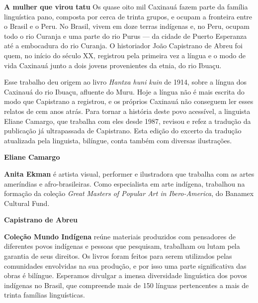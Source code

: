 \textbf{A mulher que virou tatu} Os quase oito mil Caxinauá fazem parte da família linguística pano, composta por cerca de trinta grupos, e ocupam a fronteira entre o Brasil e o Peru. No Brasil, vivem em doze terras indígenas e, no Peru, ocupam todo o rio Curanja e uma parte do rio Purus --- da cidade de Puerto Esperanza até a embocadura do rio Curanja. O historiador João Capistrano de Abreu foi quem, no início do século XX, registrou pela primeira vez a língua e o modo de vida Caxinauá junto a dois jovens provenientes da etnia, do rio Ibuaçu.

Esse trabalho deu origem ao livro \textit{Hantxa huni kuin} de 1914, sobre a língua dos Caxinauá do rio Ibuaçu, afluente do Muru. Hoje a língua não é mais escrita do modo que Capistrano a registrou, e os próprios Caxinauá não conseguem ler esses relatos de cem anos atrás. Para tornar a história deste povo acessível, a linguista Eliane Camargo, que trabalha com eles desde 1987, revisou e refez a tradução da publicação já ultrapassada de Capistrano. Esta edição do excerto da tradução atualizada pela linguista, bilíngue, conta também com diversas ilustrações.

\textbf{Eliane Camargo} \lipsum[2]

\textbf{Anita Ekman} é artista visual, performer e ilustradora que trabalha com as artes ameríndias e afro-brasileiras. Como especialista em arte indígena, trabalhou na formação da coleção \textit{Great Masters of Popular Art in Ibero-America}, do Banamex Cultural Fund.

\textbf{Capistrano de Abreu} \lipsum[2]

\textbf{Coleção Mundo Indígena} reúne materiais produzidos com pensadores de diferentes povos indígenas e pessoas que pesquisam, trabalham ou lutam pela garantia de seus direitos. Os livros foram feitos para serem utilizados pelas comunidades envolvidas na sua produção, e por isso uma parte significativa das obras é bilíngue. Esperamos divulgar a imensa diversidade linguística dos povos indígenas no Brasil, que compreende mais de 150 línguas pertencentes a mais de trinta famílias linguísticas.



